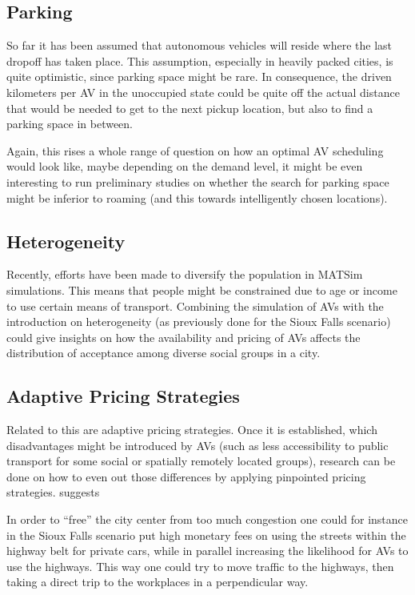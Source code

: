 \subsection{Parking}

So far it has been assumed that autonomous vehicles will reside where the last
dropoff has taken place. This assumption, especially in heavily packed cities, is
quite optimistic, since parking space might be rare. In consequence, the driven
kilometers per AV in the unoccupied state could be quite off the actual distance
that would be needed to get to the next pickup location, but also to find a parking
space in between.

Again, this rises a whole range of question on how an optimal AV scheduling would
look like, maybe depending on the demand level, it might be even interesting to
run preliminary studies on whether the search for parking space might be inferior
to roaming (and this towards intelligently chosen locations).

\subsection{Heterogeneity}

Recently, efforts have been made to diversify the population in MATSim simulations.
This means that people might be constrained due to age or income to use certain means
of transport. Combining the simulation of AVs with the introduction on heterogeneity
(as previously done for the Sioux Falls scenario) could give insights on how the
availability and pricing of AVs affects the distribution of acceptance among diverse
social groups in a city.

\subsection{Adaptive Pricing Strategies}

Related to this are adaptive pricing strategies. Once it is established, which disadvantages
might be introduced by AVs (such as less accessibility to public transport for some social or
spatially remotely located groups), research can be done on how to even out those
differences by applying pinpointed pricing strategies.  suggests

In order to ``free'' the city center from too much congestion one could for instance
in the Sioux Falls scenario put high monetary fees on using the streets within the
highway belt for private cars, while in parallel increasing the likelihood for AVs
to use the highways. This way one could try to move traffic to the highways, then
taking a direct trip to the workplaces in a perpendicular way.

